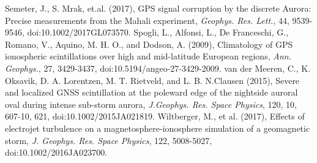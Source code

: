 \documentclass[letterpaper,12pt]{article}
\begin{document}
\begin{thebibliography}{99}
\vspace{-1em}
Semeter, J., S. Mrak, et.al. (2017), GPS signal corruption by the discrete Aurora: Precise measurements from the Mahali experiment, \textit{Geophys. Res. Lett.}, 44, 9539-9546, doi:10.1002/2017GL073570.
\vspace{-1em}
Spogli, L., Alfonsi, L., De Franceschi, G., Romano, V., Aquino, M. H. O., and Dodson, A. (2009), Climatology of GPS ionospheric scintillations over high and mid-latitude European regions, \textit{Ann. Geophys.}, 27, 3429-3437, doi:10.5194/angeo-27-3429-2009.
\vspace{-1em}
van der Meeren, C., K. Oksavik, D. A. Lorentzen, M. T. Rietveld, and L. B. N.Clausen (2015), Severe and localized GNSS scintillation at the poleward edge of the nightside auroral oval during intense sub-storm aurora, \textit{J.Geophys. Res. Space Physics}, 120, 10, 607-10, 621, doi:10.1002/2015JA021819.
\vspace{-1em}
Wiltberger, M., et al. (2017), Effects of electrojet turbulence on a magnetosphere-ionosphere simulation of a geomagnetic storm, \emph{J. Geophys. Res. Space Physics}, 122, 5008-5027, doi:10.1002/2016JA023700.
\vspace{-1em}

\end{thebibliography}
\end{document}
